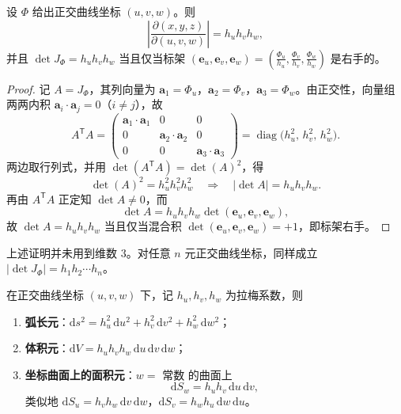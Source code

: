 \begin{theorem}[正交曲线坐标下 \(\left|\det J_\Phi\right|=h_uh_vh_w\)]
设 \(\Phi\) 给出正交曲线坐标 \((u,v,w)\)。则
\[
\left|\frac{\partial(x,y,z)}{\partial(u,v,w)}\right|=h_u h_v h_w ,
\]
并且 \(\det J_\Phi=h_uh_vh_w\) 当且仅当标架 \((\mathbf e_u,\mathbf e_v,\mathbf e_w)=\left(\frac{\Phi_u}{h_u},\frac{\Phi_v}{h_v},\frac{\Phi_w}{h_w}\right)\) 是右手的。
\end{theorem}

\begin{proof}
记 \(A=J_\Phi\)，其列向量为 \(\mathbf{a}_1=\Phi_u\)，\(\mathbf{a}_2=\Phi_v\)，\(\mathbf{a}_3=\Phi_w\)。由正交性，向量组两两内积 \(\mathbf{a}_i\cdot\mathbf{a}_j=0\)（\(i\ne j\)），故
\[
A^{\mathsf T}A=
\begin{pmatrix}
\mathbf{a}_1\cdot\mathbf{a}_1 & 0 & 0\\
0 & \mathbf{a}_2\cdot\mathbf{a}_2 & 0\\
0 & 0 & \mathbf{a}_3\cdot\mathbf{a}_3
\end{pmatrix}
=\operatorname{diag}\bigl(h_u^2,\,h_v^2,\,h_w^2\bigr).
\]
两边取行列式，并用 \(\det(A^{\mathsf T}A)=\det(A)^2\)，得
\[
\det(A)^2=h_u^2h_v^2h_w^2
\quad\Longrightarrow\quad
\left|\det A\right|=h_uh_vh_w .
\]
再由 \(A^{\mathsf T}A\) 正定知 \(\det A\ne0\)，而
\[
\det A=h_uh_vh_w\det(\mathbf e_u,\mathbf e_v,\mathbf e_w),
\]
故 \(\det A=h_uh_vh_w\) 当且仅当混合积 \(\det(\mathbf e_u,\mathbf e_v,\mathbf e_w)=+1\)，即标架右手。
\end{proof}

\begin{remark}
上述证明并未用到维数 \(3\)。对任意 \(n\) 元正交曲线坐标，同样成立 \(\left|\det J_\Phi\right|=h_1h_2\cdots h_n\)。
\end{remark}

\begin{theorem}
在正交曲线坐标 \((u,v,w)\) 下，记 \(h_u,h_v,h_w\) 为拉梅系数，则
\begin{enumerate}[label=(\arabic*)]
  \item \textbf{弧长元}：\(\displaystyle \mathrm{d}s^2=h_u^2\,\mathrm{d}u^2+h_v^2\,\mathrm{d}v^2+h_w^2\,\mathrm{d}w^2\)；
  \item \textbf{体积元}：\(\displaystyle \mathrm{d}V=h_uh_vh_w\,\mathrm{d}u\,\mathrm{d}v\,\mathrm{d}w\)；
  \item \textbf{坐标曲面上的面积元}：\(w=\) 常数 的曲面上
  \[
  \mathrm{d}S_w=h_uh_v\,\mathrm{d}u\,\mathrm{d}v ,
  \]
  类似地 \(\mathrm{d}S_u=h_vh_w\,\mathrm{d}v\,\mathrm{d}w\)，\(\mathrm{d}S_v=h_wh_u\,\mathrm{d}w\,\mathrm{d}u\)。
\end{enumerate}
\end{theorem}

